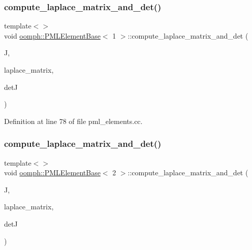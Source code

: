 \subsubsection{\texorpdfstring{compute\+\_\+laplace\+\_\+matrix\+\_\+and\+\_\+det()}{compute\_laplace\_matrix\_and\_det()}\hspace{0.1cm}{\footnotesize\ttfamily [3/12]}}
{\footnotesize\ttfamily template$<$$>$ \\
void \hyperlink{classoomph_1_1PMLElementBase}{oomph\+::\+P\+M\+L\+Element\+Base}$<$ 1 $>$\+::compute\+\_\+laplace\+\_\+matrix\+\_\+and\+\_\+det (\begin{DoxyParamCaption}\item[{const \hyperlink{classoomph_1_1DiagonalComplexMatrix}{Diagonal\+Complex\+Matrix} \&}]{J,  }\item[{\hyperlink{classoomph_1_1DenseComplexMatrix}{Dense\+Complex\+Matrix} \&}]{laplace\+\_\+matrix,  }\item[{std\+::complex$<$ double $>$ \&}]{detJ }\end{DoxyParamCaption})}



Definition at line 78 of file pml\+\_\+elements.\+cc.

\mbox{\label{classoomph_1_1PMLElementBase_a82a06fb2a00950d79074f3c60a7a5b2f}} 
\subsubsection{\texorpdfstring{compute\+\_\+laplace\+\_\+matrix\+\_\+and\+\_\+det()}{compute\_laplace\_matrix\_and\_det()}\hspace{0.1cm}{\footnotesize\ttfamily [4/12]}}
{\footnotesize\ttfamily template$<$$>$ \\
void \hyperlink{classoomph_1_1PMLElementBase}{oomph\+::\+P\+M\+L\+Element\+Base}$<$ 2 $>$\+::compute\+\_\+laplace\+\_\+matrix\+\_\+and\+\_\+det (\begin{DoxyParamCaption}\item[{const \hyperlink{classoomph_1_1DenseComplexMatrix}{Dense\+Complex\+Matrix} \&}]{J,  }\item[{\hyperlink{classoomph_1_1DenseComplexMatrix}{Dense\+Complex\+Matrix} \&}]{laplace\+\_\+matrix,  }\item[{std\+::complex$<$ double $>$ \&}]{detJ }\end{DoxyParamCaption})}



